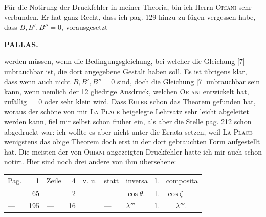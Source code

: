 \par\indent Für die Notirung der Druckfehler in meiner Theoria, bin ich Herrn \textsc{Oriani} sehr verbunden. Er hat ganz Recht, dass ich pag. 129 hinzu zu fügen vergessen habe, dass $B, B', B'' = 0$, vorausgesetzt
\par
\clearpage
\endgroup
\begingroup
\pagestyle{empty}
\newcommand{\GaussVIGathering}[2]{%
  \fancypagestyle{gaussVIGathering}{%
    \fancyhf{}%
    \renewcommand{\headrulewidth}{0pt}%
    \renewcommand{\footrulewidth}{0pt}%
    \fancyfoot[C]{\makebox[\textwidth][l]{%
      \hspace*{.025\textwidth}{\footnotesize\bfseries #1}\hfill
      {\normalsize\bfseries\textls[90]{#2}}\hspace*{.18\textwidth}}}%
  }%
  \thispagestyle{gaussVIGathering}%
}
\thispagestyle{empty}
\noindent{}%
\makebox[12mm][l]{}%
\parbox[t]{\dimexpr\linewidth-24mm\relax}{\centering\footnotesize\bfseries PALLAS.\par}%
\par\nobreak\medskip
\noindent werden müssen, wenn die Bedingungsgleichung, bei welcher die Gleichung [7] unbrauchbar ist, die dort angegebene Gestalt haben soll. Es ist übrigens klar, dass wenn auch nicht $B, B', B''=0$ sind, doch die Gleichung [7] unbrauchbar sein kann, wenn nemlich  der 12 gliedrige Ausdruck, welchen \textsc{Oriani} entwickelt hat, zufällig $=0$ oder sehr klein wird. Dass \textsc{Euler} schon das Theorem gefunden hat, woraus der schöne von mir \textsc{La Place} beigelegte Lehrsatz sehr leicht abgeleitet werden kann, fiel mir selbst schon früher ein, als aber die Stelle pag. 212 schon abgedruckt war: ich wollte es aber nicht unter die Errata setzen, weil \textsc{La Place} wenigstens das obige Theorem doch erst in der dort gebrauchten Form aufgestellt hat. Die meisten der von \textsc{Oriani} angezeigten Druckfehler hatte ich mir auch schon notirt. Hier sind noch drei andere von ihm übersehene:

\begin{center}\fontsize{10}{12}\selectfont\setlength{\tabcolsep}{5pt}\renewcommand{\arraystretch}{1.15}\begin{tabular}{lrlrlllll}
Pag. & 1 & Zeile & 4 & v. u. & statt & inversa & l. & composita\\
--- & 65 & --- & 2 & --- & --- & $\cos\theta$. & l. & $\cos\zeta$\\
--- & 195 & --- & 16 &  & --- & $\lambda'''$ & l. & $=\lambda'''$.\\
\end{tabular}\end{center}

